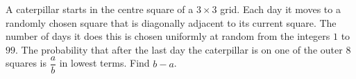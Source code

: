 A caterpillar starts in the centre square of a $3\times3$ grid. Each day it moves to a randomly chosen square that is diagonally adjacent to its current square. The number of days it does this is chosen uniformly at random from the integers $1$ to $99$. The probability that after the last day the caterpillar is on one of the outer $8$ squares is $\dfrac ab$ in lowest terms. Find $b-a$.
